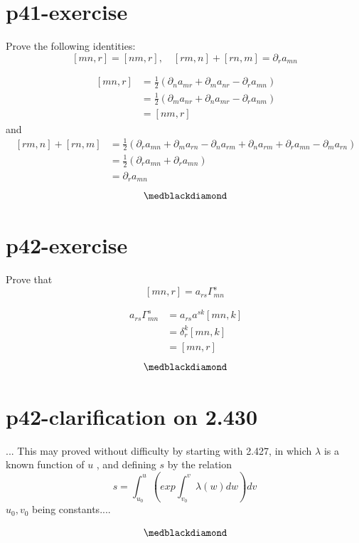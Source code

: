 \section{p41-exercise}
\begin{tcolorbox}
Prove the following identities: $$ [mn,r] = [nm,r], \quad [rm,n]+[rn,m] = \partial_r a_{mn}$$
\end{tcolorbox}
\begin{align}
\ [mn,r] &= \frac{1}{2}(\partial_{n} a_{mr}+ \partial_{m} a_{nr} - \partial_{r} a_{mn})\\
\ &= \frac{1}{2}(\partial_{m} a_{nr} + \partial_{n} a_{mr}  - \partial_{r} a_{nm})\\
\ &=[nm,r] 
\end{align}
and 
\begin{align}
\ [rm,n] + [rn,m]&= \frac{1}{2}(\partial_{r} a_{mn}+ \partial_{m} a_{rn} - \partial_{n} a_{rm} + \partial_{n} a_{rm}+ \partial_{r} a_{mn} - \partial_{m} a_{rn})\\
\ &= \frac{1}{2}(\partial_{r} a_{mn}+\partial_{r} a_{mn})\\
\ &=\partial_{r} a_{mn}
\end{align}
$$\medblackdiamond$$
\newpage

\section{p42-exercise}
\begin{tcolorbox}
Prove that  $$ [mn,r] = a_{rs}\Gamma^s_{mn}$$
\end{tcolorbox}
\begin{align}
\ a_{rs}\Gamma^s_{mn} & = a_{rs}a^{sk}[mn,k]\\
\ & = \delta^k_r[mn,k]\\
\ &= [mn,r]
\end{align}
$$\medblackdiamond$$
\newpage

\section{p42-clarification on 2.430}
\begin{tcolorbox}
... This may proved without difficulty by starting with 2.427, in which $\lambda$ is a known function of $u$ , and defining $s$ by the relation$$ s = \int^u_{u_0}(exp\int^v_{v_0} \lambda(w)dw)dv$$ $u_0, v_0$ being constants....
\end{tcolorbox}
$$\medblackdiamond$$
\newpage

